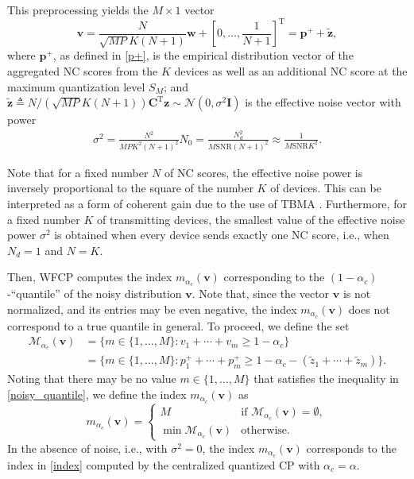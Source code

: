 \documentclass[12pt, draftclsnofoot, onecolumn]{IEEEtran}
\begin{document}
This preprocessing yields the $M\times 1$ vector
\begin{equation}\label{v}
    \boldsymbol{v}= \frac{N}{\sqrt{MP}K(N+1)}\boldsymbol{w}+\left[0,\ldots,\frac{1}{N+1}\right]^{\mathrm{T}}=\boldsymbol{p}^++{\tilde{\boldsymbol{z}}},
\end{equation}
where $\boldsymbol{p}^+$, as defined in \eqref{p+}, is the empirical distribution vector of the aggregated NC scores from the $K$ devices as well as an additional NC score at the maximum quantization level $S_M$; and ${\tilde{\boldsymbol{z}}}\triangleq N/(\sqrt{MP}K(N+1)) \boldsymbol{C}^{\mathrm{T}}\boldsymbol{z}\sim \mathcal{N}(0,\sigma^2 \mathbf{I})$ is the effective noise vector with power 
\begin{align}\label{P_eff_noi}
    \sigma^2 = \frac{N^2}{MP K^2(N+1)^2} N_0 = \frac{N_d^2}{M\text{SNR}(N+1)^2} \approx \frac{1}{M\text{SNR}K^2}.
\end{align}

Note that for a fixed number $N$ of NC scores, the effective noise power is inversely proportional to the square of the number $K$ of devices. This can be interpreted as a form of coherent gain due to the use of TBMA \cite{Tong_TBMA}. Furthermore, for a fixed number $K$ of transmitting devices, the smallest value of the effective noise power $\sigma^2$ is obtained when every device sends exactly one NC score, i.e., when $N_d=1$ and $N=K$.

Then, WFCP computes the index $m_{\alpha_c}(\boldsymbol{v})$ corresponding to the $(1-\alpha_c)$-``quantile'' of the noisy distribution $\boldsymbol{v}$. Note that, since the vector $\boldsymbol{v}$ is not normalized, and its entries may be even negative, the index $m_{\alpha_c}(\boldsymbol{v})$ does not correspond to a true quantile in general. To proceed, we define the set
\begin{align}\label{noisy_quantile}
    \mathcal{M}_{\alpha_c}(\boldsymbol{v})&= \bigg\{m \in \{1,\ldots,M\}: v_1 + \cdots + v_m \geq 1-\alpha_c \bigg\}\nonumber\\
    &= \bigg\{ m \in \{1,\ldots,M\}: p_1^+ + \cdots + p_m^+\geq 1-\alpha_c-(\tilde{z}_1+\cdots+\tilde{z}_m) \bigg\}.
\end{align}
Noting that there may be no value $m \in \{1,\ldots,M\}$ that satisfies the inequality in \eqref{noisy_quantile},  we define the index $m_{\alpha_c}(\boldsymbol{v})$ as 
\begin{equation}\label{index_quantile}
    m_{\alpha_c} (\boldsymbol{v})=
    \begin{cases}
	M & \text{if $\mathcal{M}_{\alpha_c}(\boldsymbol{v})=\emptyset$} ,\\
	\min\mathcal{M}_{\alpha_c} (\boldsymbol{v}) & \text{otherwise}.
    \end{cases}
\end{equation}
In the absence of noise, i.e., with $\sigma^2=0$, the index $ m_{\alpha_c}(\boldsymbol{v})$ corresponds to the index in \eqref{index} computed by the centralized quantized CP with $\alpha_c=\alpha$.
\end{document}
